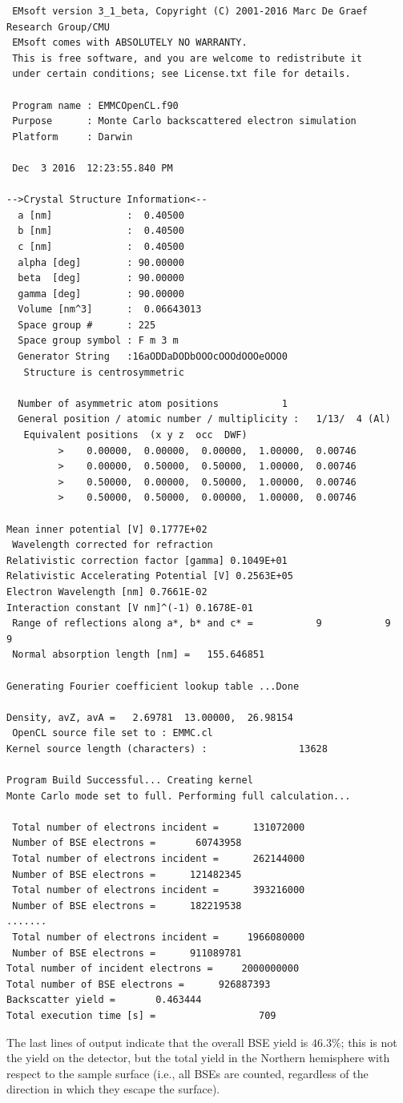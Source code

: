 \documentclass[DIV=calc, paper=letter, fontsize=11pt]{scrartcl}	 %
\begin{document}
\begin{verbatim}
 EMsoft version 3_1_beta, Copyright (C) 2001-2016 Marc De Graef Research Group/CMU
 EMsoft comes with ABSOLUTELY NO WARRANTY.
 This is free software, and you are welcome to redistribute it
 under certain conditions; see License.txt file for details.

 Program name : EMMCOpenCL.f90
 Purpose      : Monte Carlo backscattered electron simulation
 Platform     : Darwin

 Dec  3 2016  12:23:55.840 PM

-->Crystal Structure Information<--
  a [nm]             :  0.40500
  b [nm]             :  0.40500
  c [nm]             :  0.40500
  alpha [deg]        : 90.00000
  beta  [deg]        : 90.00000
  gamma [deg]        : 90.00000
  Volume [nm^3]      :  0.06643013
  Space group #      : 225
  Space group symbol : F m 3 m
  Generator String   :16aODDaDODbOOOcOOOdOOOeOOO0
   Structure is centrosymmetric

  Number of asymmetric atom positions           1
  General position / atomic number / multiplicity :   1/13/  4 (Al)
   Equivalent positions  (x y z  occ  DWF)
         >    0.00000,  0.00000,  0.00000,  1.00000,  0.00746
         >    0.00000,  0.50000,  0.50000,  1.00000,  0.00746
         >    0.50000,  0.00000,  0.50000,  1.00000,  0.00746
         >    0.50000,  0.50000,  0.00000,  1.00000,  0.00746

Mean inner potential [V] 0.1777E+02
 Wavelength corrected for refraction
Relativistic correction factor [gamma] 0.1049E+01
Relativistic Accelerating Potential [V] 0.2563E+05
Electron Wavelength [nm] 0.7661E-02
Interaction constant [V nm]^(-1) 0.1678E-01
 Range of reflections along a*, b* and c* =           9           9           9
 Normal absorption length [nm] =   155.646851    

Generating Fourier coefficient lookup table ...Done

Density, avZ, avA =   2.69781  13.00000,  26.98154
 OpenCL source file set to : EMMC.cl
Kernel source length (characters) :                13628

Program Build Successful... Creating kernel
Monte Carlo mode set to full. Performing full calculation...

 Total number of electrons incident =      131072000
 Number of BSE electrons =       60743958
 Total number of electrons incident =      262144000
 Number of BSE electrons =      121482345
 Total number of electrons incident =      393216000
 Number of BSE electrons =      182219538
.......
 Total number of electrons incident =     1966080000
 Number of BSE electrons =      911089781
Total number of incident electrons =     2000000000
Total number of BSE electrons =      926887393
Backscatter yield =       0.463444
Total execution time [s] =                  709
\end{verbatim}
The last lines of output indicate that the overall BSE yield is $46.3\%$; this is not the 
yield on the detector, but the total yield in the Northern hemisphere with respect to the 
sample surface (i.e., all BSEs are counted, regardless of the direction in which they
escape the surface).
\end{document}
